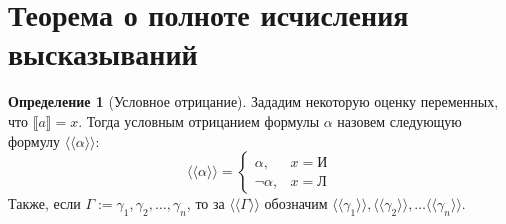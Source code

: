 \documentclass[a4paper,11pt]{article}
\theoremstyle{definition}
\newtheorem*{dfn}{Определение}
\newcommand{\True}{\text{И}}
\newcommand{\False}{\text{Л}}
\newcommand{\cn}[1]{\langle\!\!\langle #1 \rangle\!\!\rangle}
\begin{document}
\section{Теорема о полноте исчисления высказываний}
\begin{dfn}[Условное отрицание]
Зададим некоторую оценку переменных, что $\llbracket a\rrbracket = x$. Тогда
условным отрицанием формулы $\alpha$ назовем следующую формулу $\cn{\alpha}$:
\[
\cn{\alpha} =
\begin{cases}
\alpha, & x = \True\\
\neg\alpha, & x = \False
\end{cases}
\]
Также, если $\Gamma := \gamma_1, \gamma_2, \dots, \gamma_n$, то за $\cn{\Gamma}$
обозначим $\cn{\gamma_1}, \cn{\gamma_2}, \dots \cn{\gamma_n}$.
\end{dfn}
\end{document}
